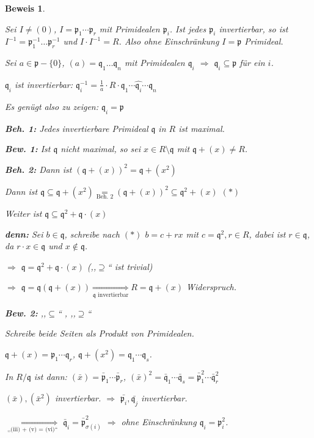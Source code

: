 \documentclass[a4paper,12pt]{scrbook}
\theoremstyle{break}
\theoremstyle{nonumberbreak}
\newtheorem{Bew}{Beweis}
\theoremstyle{nonumberplain}
\begin{document}
\begin{Bew}
\begin{description}
Sei $I \neq (0)$, $I = \mathfrak{p}_1 \cdots \mathfrak{p}_r$ mit Primidealen $\mathfrak{p}_i$. Ist jedes $\mathfrak{p}_i$ invertierbar, so ist $I^{-1} = \mathfrak{p}_1^{-1} \ldots \mathfrak{p}_r^{-1}$ und $I \cdot I^{-1} = R$. Also ohne Einschränkung $I = \mathfrak{p}$ Primideal.

Sei $a \in \mathfrak{p} - \{0\}$, $(a) = \mathfrak{q}_1 \ldots \mathfrak{q}_n$ mit Primidealen $\mathfrak{q}_i$ $\Rightarrow$ $\mathfrak{q}_i \subseteq \mathfrak{p}$ für ein $i$.

$\mathfrak{q}_i$ ist invertierbar: $\mathfrak{q}_i^{-1} = \frac{1}{a} \cdot R \cdot \mathfrak{q}_1 \cdots \widehat{\mathfrak{q}_i} \cdots \mathfrak{q}_n$

Es genügt also zu zeigen: $\mathfrak{q}_i = \mathfrak{p}$

\textbf{Beh. 1:} Jedes invertierbare Primideal $\mathfrak{q}$ in $R$ ist maximal.

\textbf{Bew. 1:}
Ist $\mathfrak{q}$ nicht maximal, so sei $x \in R \setminus \mathfrak{q}$ mit $\mathfrak{q} + (x) \neq R$.

\textbf{Beh. 2:} Dann ist $(\mathfrak{q} + (x))^2 = \mathfrak{q} + (x^2)$

Dann ist $\mathfrak{q} \subseteq \mathfrak{q} + (x^2) \underset{\text{Beh. 2}}{=} (\mathfrak{q} + (x))^2 \subseteq \mathfrak{q}^2 + (x)$ $(\ast)$

Weiter ist $\mathfrak{q} \subseteq \mathfrak{q}^2 + \mathfrak{q} \cdot (x)$

\textbf{denn:} Sei $b \in \mathfrak{q}$, schreibe nach $(\ast)$ $b = c + r x$ mit $c = \mathfrak{q}^2, r \in R$, dabei ist $r \in \mathfrak{q}$, da $r \cdot x \in \mathfrak{q}$ und $x \notin \mathfrak{q}$.

$\Rightarrow$ $\mathfrak{q} = \mathfrak{q}^2 + \mathfrak{q} \cdot (x)$ (,,$\supseteq$`` ist trivial)

$\Rightarrow$ $\mathfrak{q} = \mathfrak{q} (\mathfrak{q} + (x)) \underset{\mathfrak{q}\text{ invertierbar}}\Rightarrow R = \mathfrak{q} + (x)$ Widerspruch.

\textbf{Bew. 2:} ,,$\subseteq$`` \checkmark, ,,$\supseteq$``

Schreibe beide Seiten als Produkt von Primidealen.

$\mathfrak{q} + (x) = \mathfrak{p}_1 \cdots \mathfrak{q}_r$, $\mathfrak{q} + (x^2) = \mathfrak{q}_1 \cdots \mathfrak{q}_s$.

In $R / \mathfrak{q}$ ist dann: $(\bar{x}) = \bar{\mathfrak{p}}_1 \cdots \bar{\mathfrak{p}}_r$, $(\bar{x})^2 = \bar{\mathfrak{q}}_1 \cdots \bar{\mathfrak{q}}_s = \bar{\mathfrak{p}}_1^2 \cdots \bar{\mathfrak{q}}_r^2$

$(\bar{x}), (\bar{x}^2)$ invertierbar. $\Rightarrow$ $\bar{\mathfrak{p}_i}, \bar{\mathfrak{q}_j}$ invertierbar.

$\underset{\text{,,(iii) + (v) = (vi)``}}{\Rightarrow}$ $\bar{\mathfrak{q}}_i = \bar{\mathfrak{p}}_{\sigma(i)}^2$ $\Rightarrow$ ohne Einschränkung $\mathfrak{q}_i = \mathfrak{p}_i^2$.

\end{description}
\end{Bew}
\end{document}
